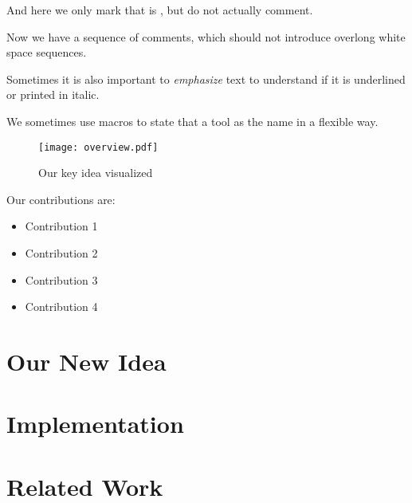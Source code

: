 \documentclass[sigplan]{acmart}
\begin{document}
And here we only mark \authorTwo[text]{} that is \authorTwo[interesting]{}, but do not
actually comment.

Now we have a sequence of comments,
which should not introduce overlong white space sequences.

Sometimes it is also important to \emph{emphasize} text to understand if it is
underlined or printed in italic.

We sometimes use macros to state that a tool as the name \toolname{} in a
flexible way.

\lipsum[1-3]

\begin{figure}
%
\texttt{[image: overview.pdf]}
\caption{Our key idea visualized}
\end{figure}

\vspace{.5em}
\noindent
Our contributions are:
\begin{itemize}
	\item Contribution 1
	\item Contribution 2
	\item Contribution 3
	\item Contribution 4
\end{itemize}

\section{Our New Idea}

\lipsum[1-3]

\section{Implementation}

\section{Related Work}
\end{document}
